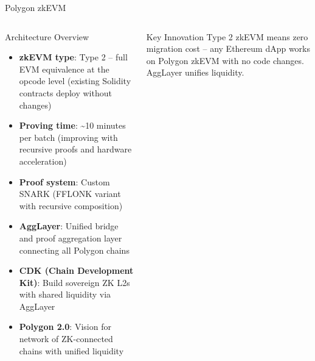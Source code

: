 \documentclass[8pt,aspectratio=169]{beamer}
\begin{document}
\begin{frame}{Polygon zkEVM}
\vspace{-1mm}
\begin{columns}[T]
\begin{block}{Architecture Overview}
\footnotesize
\begin{itemize}\setlength\itemsep{3pt}
  \item \textbf{zkEVM type}: Type 2 -- full EVM equivalence at the opcode level (existing Solidity contracts deploy without changes)
  \item \textbf{Proving time}: \textasciitilde10 minutes per batch (improving with recursive proofs and hardware acceleration)
  \item \textbf{Proof system}: Custom SNARK (FFLONK variant with recursive composition)
  \item \textbf{AggLayer}: Unified bridge and proof aggregation layer connecting all Polygon chains
  \item \textbf{CDK (Chain Development Kit)}: Build sovereign ZK L2s with shared liquidity via AggLayer
  \item \textbf{Polygon 2.0}: Vision for network of ZK-connected chains with unified liquidity
\end{itemize}
\end{block}
\vspace{1mm}
\begin{alertblock}{Key Innovation}
\footnotesize
Type 2 zkEVM means zero migration cost -- any Ethereum dApp works on Polygon zkEVM with no code changes. AggLayer unifies liquidity.
\end{alertblock}
\vspace{2mm}
\end{columns}
\end{frame}
\end{document}
